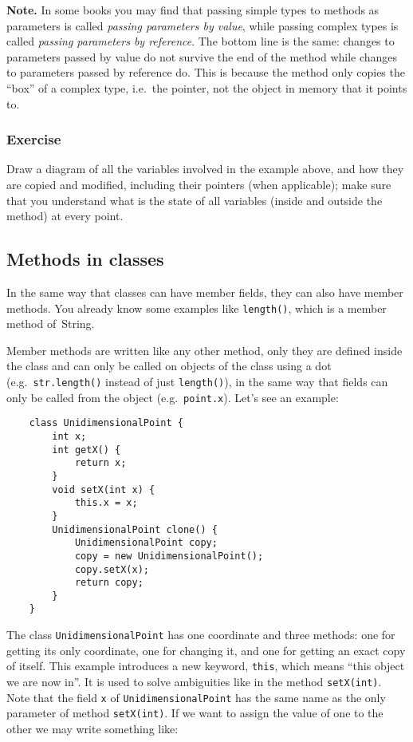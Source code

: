 \textbf{Note.} In some books you may find that passing simple types to 
methods as parameters is called \emph{passing parameters by value}, while
passing complex types is called \emph{passing parameters by reference}. The
bottom line is the same: changes to parameters passed by value do not
survive the end of the method while changes to parameters passed by
reference do. This is because the method only copies the ``box'' of a
complex type, i.e.~the pointer, not the object in memory that it points to. 

\subsubsection{Exercise}
\label{sec:exerciseff}

Draw a diagram of all the variables involved in the example above, 
and how they are copied and modified, including their pointers (when
applicable); 
make sure that you understand what is the state of all variables
(inside and outside the method) at every point. 

\subsection{Methods in classes}
\label{sec:methods-classes}

In the same way that classes can have member fields, they can also have
member methods. You already know some examples like \verb+length()+,
which is a member method of~String. 

Member methods are written like any other method, only they are
defined inside the class and can only be called on objects of the
class using a dot (e.g.~\verb+str.length()+ instead 
of just \verb+length()+), 
in the same way that fields can only
be called from the object (e.g.~\verb+point.x+). Let's see an example: 

\begin{verbatim}
    class UnidimensionalPoint {
        int x;
        int getX() {
            return x;
        }
        void setX(int x) {
            this.x = x;
        }
        UnidimensionalPoint clone() {
            UnidimensionalPoint copy;
            copy = new UnidimensionalPoint();
            copy.setX(x);
            return copy;
        }
    }
\end{verbatim}

The class \verb+UnidimensionalPoint+ has one coordinate and three
methods: one for getting its only coordinate, one for changing it, and
one for getting an exact copy of itself. This example introduces a new
keyword, \verb+this+, which means ``this object we are now in''. It is
used to solve ambiguities like in the method \verb+setX(int)+. Note
that the field \verb+x+ of \verb+UnidimensionalPoint+ has the same
name as the only parameter of method \verb+setX(int)+. If we want to
assign the value of one to the other we may write something like: 

